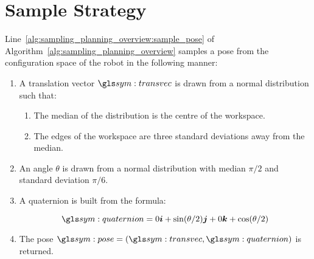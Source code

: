 \section{Sample Strategy}%
\label{sec:sample_strategy}

	Line~\ref{alg:sampling_planning_overview:sample_pose} of
	Algorithm~\ref{alg:sampling_planning_overview} samples a pose from the
	configuration space of the robot in the following manner:

	\begin{enumerate}

		\item

			A translation vector $\transvec$ is drawn from a normal
			distribution such that:
			\label{item:sample_strategy:translation}

			\begin{enumerate}

				\item

					The median of the distribution is the centre of the
					workspace.

				\item

					The edges of the workspace are three standard deviations
					away from the median.
			\end{enumerate}

		\item

			An angle $\theta$ is drawn from a normal distribution with
			median $\pi/2$ and standard deviation $\pi/6$.

			\label{item:sample_strategy:angle}

		\item

			A quaternion is built from the formula:

			\begin{equation}
				\quaternion = 0\vec{i} + \sin(\theta/2)\vec{j} + 0\vec{k} +
					\cos(\theta/2)
			\end{equation}

			\label{item:sample_strategy:quaternion}


		\item

			The pose $\pose = (\transvec, \quaternion)$ is returned.

	\end{enumerate}

